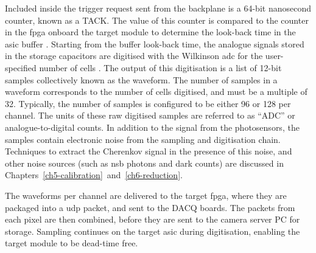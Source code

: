 Included inside the trigger request sent from the backplane is a 64-bit nanosecond counter, known as a TACK. The value of this counter is compared to the counter in the \gls{fpga} onboard the \gls{target} module to determine the look-back time in the \gls{asic} buffer \cite{Zorn2017}. Starting from the buffer look-back time, the analogue signals stored in the storage capacitors are digitised with the Wilkinson \gls{adc} for the user-specified number of cells \cite{Funk2017}. The output of this digitisation is a list of 12-bit samples collectively known as the waveform. The number of samples in a waveform corresponds to the number of cells digitised, and must be a multiple of 32. Typically, the number of samples is configured to be either 96 or 128 per channel. The units of these raw digitised samples are referred to as ``\si{ADC}'' or analogue-to-digital counts. In addition to the signal from the photosensors, the samples contain electronic noise from the sampling and digitisation chain. Techniques to extract the Cherenkov signal in the presence of this noise, and other noise sources (such as \gls{nsb} photons and dark counts) are discussed in Chapters~\ref{ch5-calibration}~and~\ref{ch6-reduction}.

The waveforms per channel are delivered to the \gls{target} \gls{fpga}, where they are packaged into a \gls{udp} packet, and sent to the DACQ boards. The packets from each pixel are then combined, before they are sent to the camera server PC for storage. Sampling continues on the \gls{target} \gls{asic} during digitisation, enabling the \gls{target} module to be dead-time free.